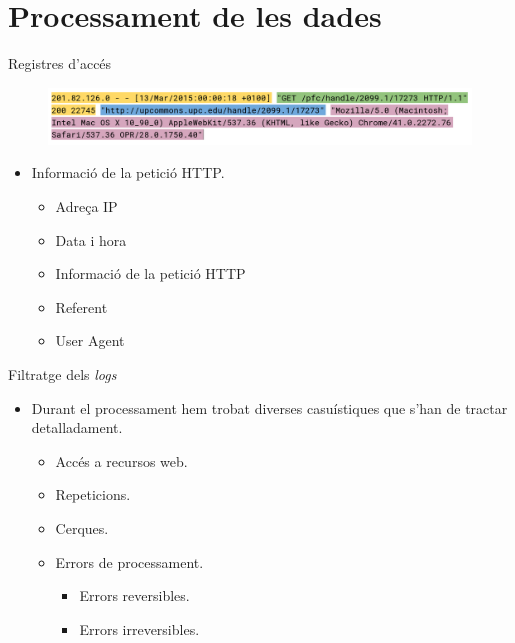 \section{Processament de les dades}\label{sec:data-processing}

\begin{frame}{Registres d'accés}

\begin{figure}
    \includegraphics[width=\textwidth]{figures/example-log}\label{fig:log-example}
\end{figure}

\begin{itemize}%
    \item Informació de la petició HTTP.
    \begin{itemize}%
        \item Adreça IP
        \item Data i hora
        \item Informació de la petició HTTP
        \item Referent
        \item User Agent
    \end{itemize}
\end{itemize}

\end{frame}


\begin{frame}{Filtratge dels \textit{logs}}
    \begin{itemize}%
        \item Durant el processament hem trobat diverses casuístiques que s'han de tractar detalladament.
        \begin{itemize}%
            \item Accés a recursos web.
            \item Repeticions.
            \item Cerques.
            \item Errors de processament.
            \begin{itemize}%
                \item Errors reversibles.
                \item Errors irreversibles.
            \end{itemize}
        \end{itemize}
    \end{itemize}
\end{frame}


